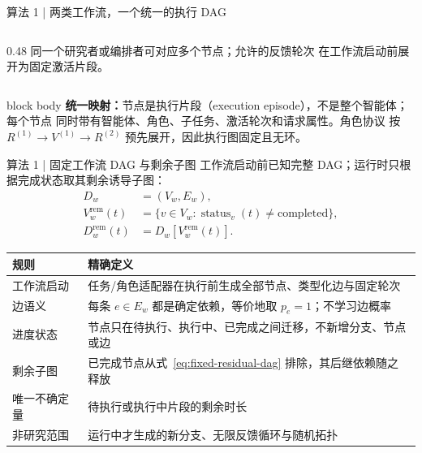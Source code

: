\begin{frame}{算法 1 | 两类工作流，一个统一的执行 DAG}
\begin{columns}[T,onlytextwidth]
\begin{column}{0.48\textwidth}
      \scriptsize
      同一个研究者或编排者可对应多个节点；允许的反馈轮次
      在工作流启动前展开为固定激活片段。
    \end{column}
  \end{columns}

  \vspace{0.12cm}
  \begin{beamercolorbox}[rounded=true,sep=0.75ex,wd=0.98\textwidth]{block body}
    \scriptsize
    \textbf{统一映射：}节点是执行片段（execution episode），不是整个智能体；每个节点
    同时带有智能体、角色、子任务、激活轮次和请求属性。角色协议
    按 $R^{(1)}\!\rightarrow V^{(1)}\!\rightarrow R^{(2)}$ 预先展开，因此执行图固定且无环。
  \end{beamercolorbox}

  \vspace{0.06cm}
\end{frame}

\begin{frame}{算法 1 | 固定工作流 DAG 与剩余子图}
  \small
  工作流启动前已知完整 DAG；运行时只根据完成状态取其剩余诱导子图：
  \begin{equation}
    \begin{aligned}
      D_w&=(V_w,E_w),\\
      V_w^{\mathrm{rem}}(t)
        &=\{v\in V_w:\operatorname{status}_v(t)\neq\mathrm{completed}\},\\
      D_w^{\mathrm{rem}}(t)
        &=D_w[V_w^{\mathrm{rem}}(t)].
    \end{aligned}
    \label{eq:fixed-residual-dag}
  \end{equation}

  \scriptsize
  \renewcommand{\arraystretch}{1.14}
  \begin{tabularx}{\textwidth}{p{}X}
    \toprule
    规则 & 精确定义 \\
    \midrule
    工作流启动 & 任务/角色适配器在执行前生成全部节点、类型化边与固定轮次 \\
    边语义 & 每条 $e\in E_w$ 都是确定依赖，等价地取 $p_e=1$；不学习边概率 \\
    进度状态 & 节点只在待执行、执行中、已完成之间迁移，不新增分支、节点或边 \\
    剩余子图 & 已完成节点从式~\eqref{eq:fixed-residual-dag} 排除，其后继依赖随之释放 \\
    唯一不确定量 & 待执行或执行中片段的剩余时长 \\
    非研究范围 & 运行中才生成的新分支、无限反馈循环与随机拓扑 \\
    \bottomrule
  \end{tabularx}

  \vspace{0.08cm}
\end{frame}

